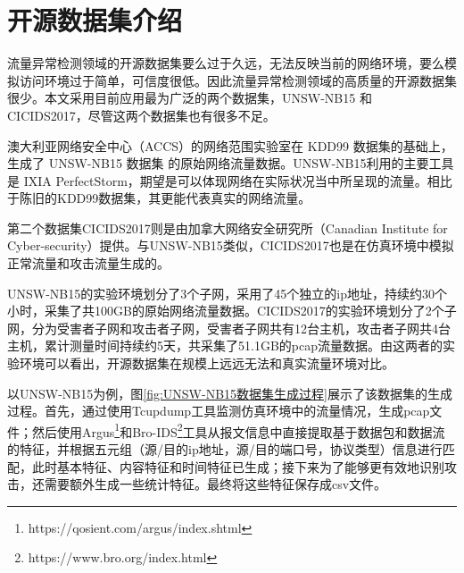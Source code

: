 
\section{开源数据集介绍}
流量异常检测领域的开源数据集要么过于久远，无法反映当前的网络环境，要么模拟访问环境过于简单，可信度很低。因此流量异常检测领域的高质量的开源数据集很少。本文采用目前应用最为广泛的两个数据集，UNSW-NB15 和 CICIDS2017，尽管这两个数据集也有很多不足。

澳大利亚网络安全中心（ACCS）的网络范围实验室在 KDD99 数据集的基础上，生成了 UNSW-NB15 数据集\cite{moustafa2015unsw} 的原始网络流量数据。UNSW-NB15利用的主要工具是 IXIA PerfectStorm，期望是可以体现网络在实际状况当中所呈现的流量。相比于陈旧的KDD99数据集\cite{ozgur2016review}，其更能代表真实的网络流量。

第二个数据集CICIDS2017则是由加拿大网络安全研究所（Canadian Institute for Cyber-security）提供。与UNSW-NB15类似，CICIDS2017也是在仿真环境中模拟正常流量和攻击流量生成的。

UNSW-NB15的实验环境划分了3个子网，采用了45个独立的ip地址，持续约30个小时，采集了共100GB的原始网络流量数据。CICIDS2017的实验环境划分了2个子网，分为受害者子网和攻击者子网，受害者子网共有12台主机，攻击者子网共4台主机，累计测量时间持续约5天，共采集了51.1GB的pcap流量数据。由这两者的实验环境可以看出，开源数据集在规模上远远无法和真实流量环境对比。




以UNSW-NB15为例，图\ref{fig:UNSW-NB15数据集生成过程}展示了该数据集的生成过程。首先，通过使用Tcupdump工具监测仿真环境中的流量情况，生成pcap文件；然后使用Argus\footnote{https://qosient.com/argus/index.shtml}和Bro-IDS\footnote{https://www.bro.org/index.html}工具从报文信息中直接提取基于数据包和数据流的特征，并根据五元组（源/目的ip地址，源/目的端口号，协议类型）信息进行匹配，此时基本特征、内容特征和时间特征已生成；接下来为了能够更有效地识别攻击，还需要额外生成一些统计特征。最终将这些特征保存成csv文件。



